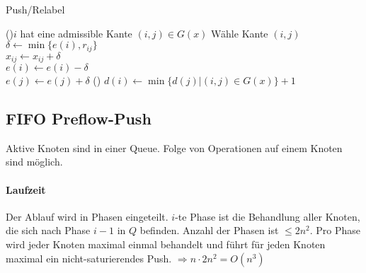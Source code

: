 \begin{algorithm}
 \caption{Push/Relabel}
 \uIf(){$i$ hat eine admissible Kante $(i,j)\in G(x)$}{
    Wähle Kante $(i,j)$\\
    $\delta \gets \min\{e(i), r_{ij}\}$\\
    $x_{ij} \gets x_{ij} + \delta$\\
    $e(i) \gets e(i) - \delta$\\
    $e(j) \gets e(j) + \delta$
 }
 \Else(){
    $d(i) \gets \min\{ d(j) | (i,j) \in G(x) \} + 1$
 }
 
 
 
\end{algorithm}



\subsection{FIFO Preflow-Push}
Aktive Knoten sind in einer Queue. Folge von Operationen auf einem Knoten sind möglich.
\paragraph{Laufzeit} Der Ablauf wird in Phasen eingeteilt. $i$-te Phase ist die Behandlung aller Knoten, die sich nach Phase $i-1$ in $Q$ befinden. Anzahl der Phasen ist $\leq 2n^2$. Pro Phase wird jeder Knoten maximal einmal behandelt und führt für jeden Knoten maximal ein nicht-saturierendes Push. $\Rightarrow n\cdot 2n^2 = O(n^3)$


